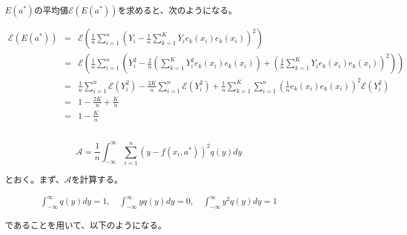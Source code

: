 \documentclass[a4paper,xelatex,ja=standard,jafont=hiragino-pron, 10pt]{bxjsarticle}
\begin{document}
\subsection{}
$E(a^*)$の平均値$\mathscr{E}(E(a^*))$を求めると、次のようになる。

\begin{eqnarray}
  \mathscr{E}\left(E(a^*)\right)
    &=& \mathscr{E}\left(\frac{1}{n}
      \sum_{i=1}^n
        \left(
          Y_i - \frac{1}{n}\sum_{k=1}^K Y_i e_k(x_i) e_k(x_i)
        \right)^2\right) \nonumber \\
    &=& \mathscr{E}\left(\frac{1}{n} \sum_{i=1}^n
      \left(
        Y_i^2 - \frac{2}{n} \left(
          \sum_{k=1}^K Y_i^2 e_k(x_i) e_k(x_i)
        \right) + \left(
          \frac{1}{n} \sum_{k=1}^K Y_i e_k(x_i) e_k(x_i)
        \right)^2\right)
      \right) \nonumber \\
    &=& \frac{1}{n} \sum_{i=1}^n \mathscr{E} \left(Y_i^2\right) -
      \frac{2K}{n} \sum_{i=1}^n \mathscr{E} \left(Y_i^2\right) +
      \frac{1}{n}
        \sum_{k=1}^K \sum_{i=1}^n
          \left(
            \frac{1}{n}e_k(x_i)e_k(x_i)
          \right)^2  \mathscr{E}(Y_i^2) \nonumber \\
      &=& 1 - \frac{2K}{n} + \frac{K}{n} \nonumber \\
      &=& 1 - \frac{K}{n}
\end{eqnarray}
\subsection{}

\begin{equation}
  \mathscr{A} = \frac{1}{n} \int_{- \infty}^{\infty}\sum_{i=1}^n \left(
    y - f(x_i, a^*)
  \right)^2 q(y) dy
\end{equation}

とおく。まず、$\mathscr{A}$を計算する。

\begin{equation}
  \begin{split}
    \int_{-\infty}^{\infty}q(y)dy = 1, \quad
    \int_{-\infty}^{\infty}yq(y)dy = 0, \quad
    \int_{-\infty}^{\infty}y^2q(y)dy = 1
  \end{split}
\end{equation}

であることを用いて、以下のようになる。
\end{document}
